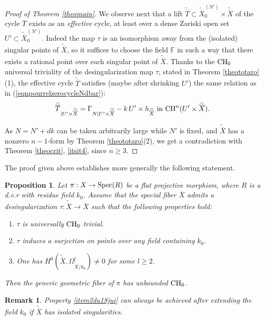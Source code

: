 \documentclass[10pt]{article}
\newtheorem{prop}[theo]{Proposition}
\newtheorem{rema}[theo]{Remark}
\begin{document}
\begin{proof}[Proof of Theorem \ref{theomain}]
 We observe next that a lift $\widetilde{\overline{T}}\subset \widetilde{\overline{X}}^{(N')}_0\times \widetilde{\overline{X}}$  of  the cycle $\overline{T}$  exists  as an {\it effective} cycle, at least over a dense  Zariski open set $U'\subset \widetilde{\overline{X}}^{(N')}_0$. Indeed the map $\tau$ is an isomorphism away from the (isolated) singular points of  $\widetilde{\overline{X}}$, so it suffices to choose the field $\mathbb{F}$ in such a way that there exists a rational point over each singular point of $\widetilde{\overline{X}}$. Thanks to the ${\rm CH}_0$ universal triviality of the desingularization map
$\tau$, stated in Theorem \ref{theototaro}(1), the effective cycle $\widetilde{\overline{T}}$  satisfies (maybe after shrinking $U'$) the same relation as in (\ref{eqnpourrelzerocycleNdbar}):
\begin{eqnarray}\label{eqnpourrelzerocycleNdbartilde}
\widetilde{\overline{T}}_{\mid U'\times \widetilde{\overline{X}}}=\Gamma_{N\mid U'\times \widetilde{\overline{X}}}- k \, U'\times h_{\widetilde{\overline{X}}}\,\,{\rm in}\,\,{\rm CH}^n(U'\times \widetilde{\overline{X}}).
\end{eqnarray}

As  $N=N'+dk$ can be taken arbitrarily large while $N'$ is fixed, and $\widetilde{\overline{X}}$ has a nonzero $n-1$-form  by Theorem \ref{theototaro}(2),  we get a contradiction with Theorem \ref{theocrit}, \ref{itsit4}, since $n\geq3$.
\end{proof}

The proof given above establishes more generally the following statement.


\begin{prop}\label{newpropdu16juillet} Let $\pi: X\rightarrow {\rm Spec}(R)$ be a flat projective morphism, where $R$ is a d.v.r with residue field $k_0$. Assume that the special fiber $\overline{X}$  admits a desingularization $\tau: \widetilde{\overline{X}}\rightarrow \overline{X}$ such that the following properties hold:
\begin{enumerate}
\item $\tau$ is universally ${\rm CH}_0$ trivial.
\item \label{item2du18jui} $\tau$ induces   a surjection on points over any field containing $k_0$.
\item  One has $H^0(\widetilde{\overline{X}},\Omega^l_{\widetilde{\overline{X}}/k_0})\not=0$ for some $l\geq 2$.
\end{enumerate}
Then the generic geometric fiber of $\pi$ has unbounded ${\rm CH}_0$.
\end{prop}
\begin{rema} {\rm Property  \ref{item2du18jui} can always be achieved after extending the field $k_0$ if $\widetilde{\overline{X}}$ has isolated singularities.}
\end{rema}
\end{document}
